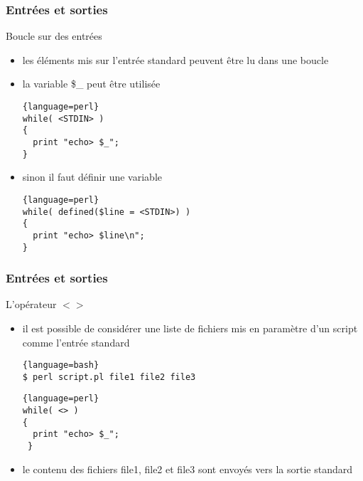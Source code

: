 \begin{frame}[fragile]
  \frametitle{Entrées et sorties}

  \begin{block}{Boucle sur des entrées}
    \begin{itemize}
    \item les éléments mis sur l'entrée standard peuvent être lu dans une boucle
    \item la variable \$\_ peut être utilisée
    \begin{lstlisting}{language=perl}
while( <STDIN> )
{
  print "echo> $_";
}
    \end{lstlisting}
  \item sinon il faut définir une variable
    \begin{lstlisting}{language=perl}
while( defined($line = <STDIN>) )
{
  print "echo> $line\n";
}
    \end{lstlisting}
    \end{itemize}
  \end{block}

\end{frame}

\begin{frame}[fragile]
  \frametitle{Entrées et sorties}

  \begin{block}{L'opérateur $<>$}
    \begin{itemize}
    \item il est possible de considérer une liste de fichiers mis en
      paramètre d'un script comme l'entrée standard
      \begin{lstlisting}{language=bash}
$ perl script.pl file1 file2 file3
      \end{lstlisting}
      \begin{lstlisting}{language=perl}
while( <> )
{
  print "echo> $_";
 }
      \end{lstlisting}
    \item le contenu des fichiers file1, file2 et file3 sont envoyés vers la
      sortie standard
    \end{itemize}
  \end{block}

\end{frame}

